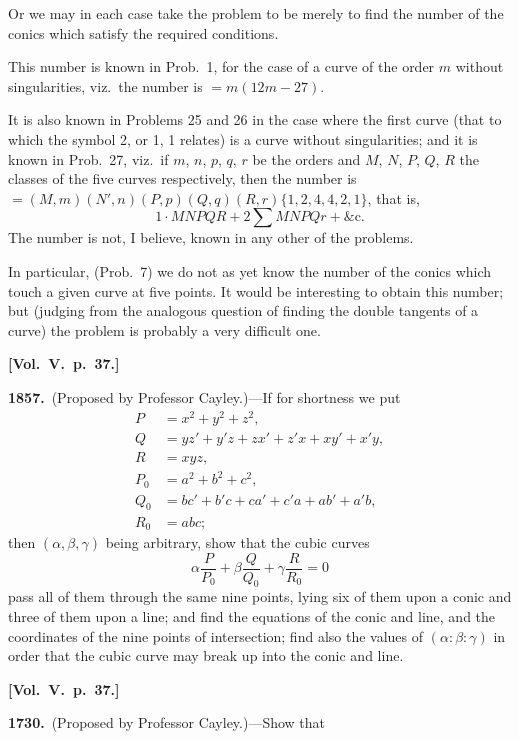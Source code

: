 \documentclass[11pt,a4paper]{article}
\theoremstyle{plain}
\theoremstyle{definition}
\theoremstyle{remark}
\begin{document}
Or we may in each case take the problem to be merely to find the number of the conics which satisfy the required conditions.

This number is known in Prob.\ 1, for the case of a curve of the order $m$ without singularities, viz.\ the number is $=m(12m-27)$.

It is also known in Problems 25 and 26 in the case where the first curve (that to which the symbol 2, or 1, 1 relates) is a curve without singularities; and it is known in Prob.\ 27, viz.\ if $m$, $n$, $p$, $q$, $r$ be the orders and $M$, $N$, $P$, $Q$, $R$ the classes of the five curves respectively, then the number is $=(M,m)(N',n)(P,p)(Q,q)(R,r)\{1,2,4,4,2,1\}$, that is,
\[
1\cdot MNPQR + 2\sum MNPQr + \&\text{c.}
\]
The number is not, I believe, known in any other of the problems.

In particular, (Prob.\ 7) we do not as yet know the number of the conics which touch a given curve at five points. It would be interesting to obtain this number; but (judging from the analogous question of finding the double tangents of a curve) the problem is probably a very difficult one.

\textbf{[Vol.\ V.\ p.\ 37.]}

\textbf{1857.}\ (Proposed by Professor Cayley.)---If for shortness we put
\begin{align*}
P &= x^{2}+y^{2}+z^{2},\\
Q &= yz'+y'z+zx'+z'x+xy'+x'y,\\
R &= xyz,\\
P_{0} &= a^{2}+b^{2}+c^{2},\\
Q_{0} &= bc'+b'c+ca'+c'a+ab'+a'b,\\
R_{0} &= abc;
\end{align*}
then $(\alpha,\beta,\gamma)$ being arbitrary, show that the cubic curves
\[
\alpha\frac{P}{P_{0}}+\beta\frac{Q}{Q_{0}}+\gamma\frac{R}{R_{0}}=0
\]
pass all of them through the same nine points, lying six of them upon a conic and three of them upon a line; and find the equations of the conic and line, and the coordinates of the nine points of intersection; find also the values of $(\alpha:\beta:\gamma)$ in order that the cubic curve may break up into the conic and line.

\textbf{[Vol.\ V.\ p.\ 37.]}

\textbf{1730.}\ (Proposed by Professor Cayley.)---Show that
\end{document}
